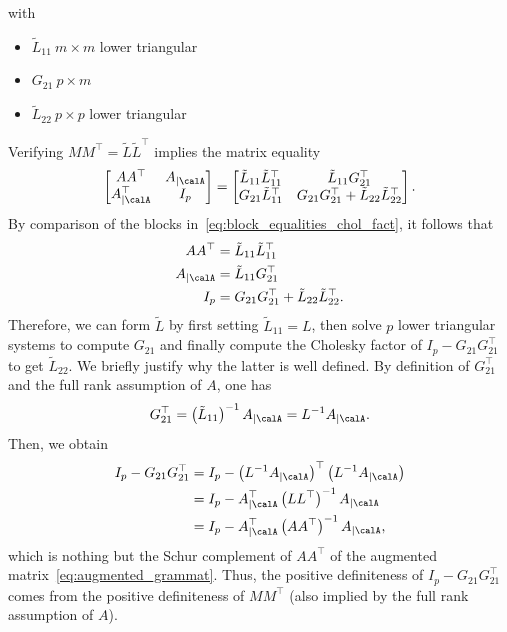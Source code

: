 with 
\begin{itemize}
	\item $\tilde{L}_{11} \ m\times m$ lower triangular
	\item $G_{21} \ p\times m$
	\item $\tilde{L}_{22} \ p \times p$ lower triangular
\end{itemize}
Verifying $MM^\top= \tilde{L}\tilde{L}^\top$ implies the matrix equality
\begin{equation}\label{eq:block_equalities_chol_fact}
	\begin{bmatrix}
		AA^\top &  A_{|\calA} \\  A_{|\calA}^\top & I_p
	\end{bmatrix}
	=
	\begin{bmatrix}
		\tilde{L}_{11}\tilde{L}_{11}^\top & \tilde{L}_{11}G_{21}^\top \\ 
		G_{21}\tilde{L}_{11}^\top & G_{21}G_{21}^\top + \tilde{L}_{22}\tilde{L}_{22}^\top
	\end{bmatrix}.
\end{equation}
By comparison of the blocks in~\eqref{eq:block_equalities_chol_fact}, it follows that
\begin{equation*}
	\begin{aligned}
		AA^\top &= \tilde{L}_{11}\tilde{L}_{11}^\top \\
		A_{|\calA} &= \tilde{L}_{11}G_{21}^\top \\
		I_p &= G_{21}G_{21}^\top + \tilde{L}_{22}\tilde{L}_{22}^\top.
	\end{aligned}
\end{equation*}
Therefore, we can form $\tilde{L}$ by first setting $\tilde{L}_{11}=L$, then solve $p$ lower triangular systems to compute $G_{21}$ and finally compute the Cholesky factor of $I_p-G_{21}G_{21}^\top$ to get $\tilde{L}_{22}$. We briefly justify why the latter is well defined. By definition of $G_{21}^\top$ and the full rank assumption of $A$, one has
\[G_{21}^\top = \left(\tilde{L}_{11}\right)^{-1}A_{|\calA} = L^{-1}A_{|\calA}.\]
Then, we obtain
\begin{equation*}
	\begin{aligned}
		I_p - G_{21}G_{21}^\top &= I_p - \left(L^{-1}A_{|\calA}\right)^\top\left(L^{-1}A_{|\calA}\right) \\
		&= I_p - A_{|\calA}^\top \left(LL^\top\right)^{-1}A_{|\calA} \\
		&= I_p - A_{|\calA}^\top \left(AA^\top\right)^{-1}A_{|\calA},
	\end{aligned}
\end{equation*}
which is nothing but the Schur complement of $AA^\top$ of the augmented matrix~\eqref{eq:augmented_grammat}. Thus, the positive definiteness of $I_p-G_{21}G_{21}^\top$ comes from the positive definiteness of $MM^\top$ (also implied by the full rank assumption of $A$).

